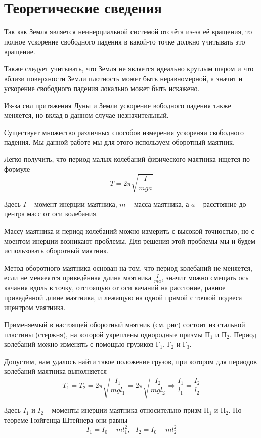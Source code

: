 \documentclass[a4paper, 12pt]{article} %
\begin{document}
\section{Теоретические сведения}

Так как Земля является неинерциальной системой отсчёта из-за её вращения, то полное ускорение свободного падения в какой-то точке должно учитывать это вращение.

Также следует учитывать, что Земля не является идеально круглым шаром и что вблизи поверхности Земли плотность может быть неравномерной, а значит и ускорение свободного падения локально может быть искажено.

Из-за сил притяжения Луны и Земли ускорение вободного падения также меняется, но вклад в данном случае незначительный.

Существует множество различных способов измерения ускореняи свободного падения. Мы данной работе мы для этого используем оборотный маятник.

Легко получить, что период малых колебаний физического маятника ищется по формуле
\[T = 2\pi \sqrt{\frac{I}{mga}}\]

Здесь $I$ -- момент инерции маятника, $m$ -- масса маятника, а $a$ -- расстояние до центра масс от оси колебания.

Массу маятника и период колебаний можно измерить с высокой точностью, но с моентом инерции возникают проблемы. Для решения этой проблемы мы и будем использовать оборотный маятник.

Метод оборотного маятника основан на том, что период колебаний не меняется, если не меняеятся приведённая длина маятника $\frac{I}{ma}$, значит можно смещать ось качания вдоль в точку, отстоящую от оси качаний на расстоние, равное приведённой длине маятника, и лежащую на одной прямой с точкой подвеса ицентром маятника.

Применяемый в настоящей оборотный маятник (см. рис) состоит из стальной пластины (стержня), на которой укреплены однородные призмы $\text{П}_1$ и $\text{П}_2$. Период колебаний можно изменять с помощью грузиков $\text{Г}_1$, $\text{Г}_2$ и $\text{Г}_3$.

Допустим, нам удалось найти такое положение грузов, при котором для периодов колебаний маятника выполняется
\[T_1 = T_2 = 2\pi \sqrt{\frac{I_1}{mgl_1}} = 2\pi \sqrt{\frac{I_2}{mgl_2}}\Rightarrow \frac{I_1}{l_1} = \frac{I_2}{l_2}\]

Здесь $I_1$ и $I_2$ -- моменты инерции маятника относительно призм $\text{П}_1$ и $\text{П}_2$. По теореме Гюйгенца-Штейнера они равны
\[I_1 = I_0 + ml_1^2,\text{ } I_2 = I_0 + ml^2_2\] 
\end{document}
